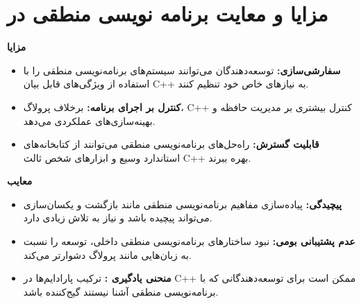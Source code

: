 \documentclass[12pt, a4paper]{report}
\begin{document}
\section{مزایا و معایت برنامه نویسی منطقی در }
\textbf{مزایا}
\begin{itemize}
\item \textbf{سفارشی‌سازی:} توسعه‌دهندگان می‌توانند سیستم‌های برنامه‌نویسی منطقی را با استفاده از ویژگی‌های قابل بیان C++ به نیازهای خاص خود تنظیم کنند.

\item \textbf{کنترل بر اجرای برنامه:} برخلاف پرولاگ، C++ کنترل بیشتری بر مدیریت حافظه و بهینه‌سازی‌های عملکردی می‌دهد.

\item \textbf{قابلیت گسترش:} راه‌حل‌های برنامه‌نویسی منطقی می‌توانند از کتابخانه‌های استاندارد وسیع و ابزارهای شخص ثالث C++ بهره ببرند.
\end{itemize}

\textbf{معایب}
\begin{itemize}
	\item \textbf{پیچیدگی:} پیاده‌سازی مفاهیم برنامه‌نویسی منطقی مانند بازگشت و یکسان‌سازی می‌تواند پیچیده باشد و نیاز به تلاش زیادی دارد.
	
	\item \textbf{عدم پشتیبانی بومی:} نبود ساختارهای برنامه‌نویسی منطقی داخلی، توسعه را نسبت به زبان‌هایی مانند پرولاگ دشوارتر می‌کند.
	
	
	\item \textbf{منحنی یادگیری :} ترکیب پارادایم‌ها در C++ ممکن است برای توسعه‌دهندگانی که با برنامه‌نویسی منطقی آشنا نیستند گیج‌کننده باشد.
\end{itemize}
\end{document}
